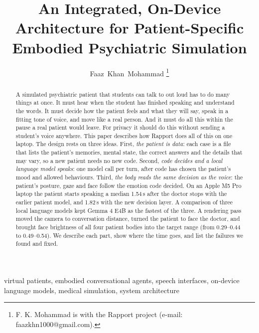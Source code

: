 \documentclass[journal]{IEEEtran}
\begin{document}
\title{An Integrated, On-Device Architecture for Patient-Specific Embodied Psychiatric Simulation}

\author{Faaz~Khan~Mohammad%
\thanks{F. K. Mohammad is with the Rapport project (e-mail: faazkhn1000@gmail.com).}}

\maketitle

\begin{abstract}
A simulated psychiatric patient that students can talk to out loud has to do many things at once. It must hear when the student has finished speaking and understand the words. It must decide how the patient feels and what they will say, speak in a fitting tone of voice, and move like a real person. And it must do all this within the pause a real patient would leave. For privacy it should do this without sending a student's voice anywhere. This
paper describes how Rapport does all of this on one laptop. The design rests on three ideas. First, \emph{the patient is data}: each case is a
file that lists the patient's memories, mental state, the correct answers and the details that may vary, so a new patient needs no new code.
Second, \emph{code decides and a local language model speaks}: one model call per turn, after code has chosen the patient's mood and allowed
behaviours. Third, \emph{the body reads the same decision as the voice}: the patient's posture, gaze and face follow the emotion code decided.
On an Apple M5 Pro laptop the patient starts speaking a median 1.54\,s after the doctor stops with the earlier patient model, and 1.82\,s with
the new decision layer. A comparison of three local language models kept Gemma 4 E4B as the fastest of the three. A rendering pass moved the
camera to conversation distance, turned the patient to face the doctor, and brought face brightness of all four patient bodies into the
target range (from 0.29--0.44 to 0.49--0.54). We describe each part, show where the time goes, and list the failures we found and fixed.
\end{abstract}

\begin{IEEEkeywords}
virtual patients, embodied conversational agents, speech interfaces, on-device language models, medical simulation, system architecture
\end{IEEEkeywords}
\end{document}
